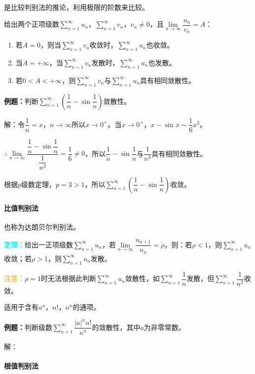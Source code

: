 \documentclass[UTF8, 12pt]{ctexart}
\begin{document}
是比较判别法的推论，利用极限的阶数来比较。

给出两个正项级数$\sum\limits_{n=1}^\infty u_n$，$\sum\limits_{n=1}^\infty v_n$，$v_n\neq0$，且$\lim\limits_{n\to\infty}\dfrac{u_n}{v_n}=A$：

\begin{enumerate}
    \item 若$A=0$，则当$\sum\limits_{n=1}^\infty v_n$收敛时，$\sum\limits_{n=1}^\infty u_n$也收敛。
    \item 当$A=+\infty$，当$\sum\limits_{n=1}^\infty v_n$发散时，$\sum\limits_{n=1}^\infty u_n$也发散。
    \item 若$0<A<+\infty$，则$\sum\limits_{n=1}^\infty v_n$与$\sum\limits_{n=1}^\infty u_n$具有相同敛散性。
\end{enumerate}

\textbf{例题：}判断$\sum\limits_{n=1}^\infty\left(\dfrac{1}{n}-\sin\dfrac{1}{n}\right)$敛散性。

解：令$\dfrac{1}{n}=x$，$n\to\infty$所以$x\to0^+$。当$x\to0^+$，$x-\sin x\sim\dfrac{1}{6}x^3$。

$\therefore\lim\limits_{n\to\infty}\dfrac{\dfrac{1}{n}-\sin\dfrac{1}{n}}{\dfrac{1}{n^3}}=\dfrac{1}{6}\neq0$，所以$\dfrac{1}{n}-\sin\dfrac{1}{n}$与$\dfrac{1}{n^3}$具有相同敛散性。

根据$p$级数定理，$p=3>1$，所以$\sum\limits_{n=1}^\infty\left(\dfrac{1}{n}-\sin\dfrac{1}{n}\right)$收敛。

\paragraph{比值判别法} \leavevmode \medskip

也称为达朗贝尔判别法。

\textcolor{aqua}{\textbf{定理：}}给出一正项级数$\sum\limits_{n=1}^\infty u_n$，若$\lim\limits_{n\to\infty}\dfrac{u_{n+1}}{u_n}=\rho$，则：若$\rho<1$，则$\sum\limits_{n=1}^\infty u_n$收敛；若$\rho>1$，则$\sum\limits_{n=1}^\infty u_n$发散。

\textcolor{orange}{注意：}$\rho=1$时无法根据此判断$\sum\limits_{n=1}^\infty u_n$敛散性，如$\sum\limits_{n=1}^\infty\dfrac{1}{n}$发散，但$\sum\limits_{n=1}^\infty\dfrac{1}{n^2}$收敛。

适用于含有$a^n$，$n!$，$n^n$的通项。

\textbf{例题：}判断级数$\sum\limits_{n=1}^\infty\dfrac{\vert a\vert^nn!}{n^n}$的敛散性，其中$a$为非零常数。

解：

\paragraph{根值判别法} \leavevmode \medskip
\end{document}
